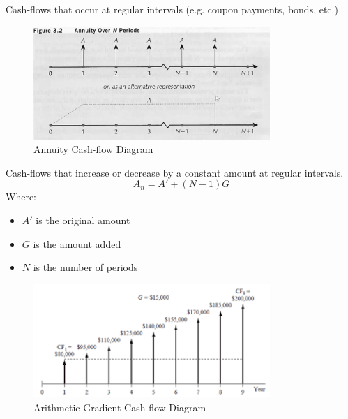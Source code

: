 \begin{definition}
    [Annuity]
    Cash-flows that occur at regular intervals (e.g. coupon payments, bonds, etc.)
\end{definition}
\begin{figure}[H]
    \centering
    \includegraphics[width=0.8\textwidth]{LECTURE_2/annuity.png}
    \caption{Annuity Cash-flow Diagram}
    \label{fig:annuity_cash-flow}
\end{figure}

\begin{definition}
    Cash-flows that increase or decrease by a constant amount at regular intervals.
    \begin{equation}
        A_n = A' + (N-1)G
    \end{equation}
    Where:
    \begin{itemize}
        \item $A'$ is the original amount
        \item $G$ is the amount added
        \item $N$ is the number of periods
    \end{itemize}
\end{definition}
\begin{figure}[H]
    \centering
    \includegraphics[width=0.8\textwidth]{LECTURE_2/arithmetic_gradient.png}
    \caption{Arithmetic Gradient Cash-flow Diagram}
    \label{fig:arithmetic_gradient_cash-flow}
\end{figure}

